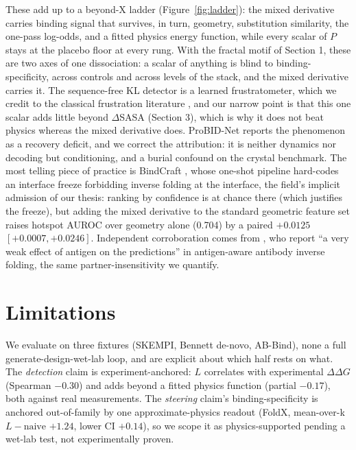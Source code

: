 \documentclass{article} %
\begin{document}
These add up to a beyond-X ladder (Figure~\ref{fig:ladder}): the mixed derivative carries binding signal that
survives, in turn, geometry, substitution similarity, the one-pass log-odds, and a fitted physics energy function,
while every scalar of $P$ stays at the placebo floor at every rung. With the fractal motif of Section 1, these are
two axes of one dissociation: a scalar of anything is blind to binding-specificity, across controls and across
levels of the stack, and the mixed derivative carries it. The sequence-free KL detector is a learned
frustratometer, which we credit to the classical frustration literature \citep{ferreiro2007frustration,
freiberger2019frustration}, and our narrow point is that this one scalar adds little beyond $\Delta$SASA (Section
3), which is why it does not beat physics whereas the mixed derivative does. ProBID-Net reports the phenomenon as a recovery deficit, and we
correct the attribution: it is neither dynamics nor decoding but conditioning, and a burial confound on the crystal
benchmark. The most telling piece of practice is BindCraft \citep{pacesa2024bindcraft}, whose one-shot pipeline
hard-codes an interface freeze forbidding inverse folding at the interface, the field's implicit admission of our
thesis: ranking by confidence is at chance there (which justifies the freeze), but adding the mixed derivative to
the standard geometric feature set raises hotspot AUROC over geometry alone (0.704) by a paired $+0.0125$
$[+0.0007, +0.0246]$. Independent corroboration comes from \citet{janusz2026antigen}, who report ``a very weak
effect of antigen on the predictions'' in antigen-aware antibody inverse folding, the same partner-insensitivity we
quantify.


\section{Limitations}

We evaluate on three fixtures (SKEMPI, Bennett de-novo, AB-Bind), none a full generate-design-wet-lab loop, and are
explicit about which half rests on what. The \emph{detection} claim is experiment-anchored: $L$ correlates with
experimental $\Delta\Delta G$ (Spearman $-0.30$) and adds beyond a fitted physics function (partial $-0.17$), both
against real measurements. The \emph{steering} claim's binding-specificity is anchored out-of-family by one
approximate-physics readout (FoldX, mean-over-k $L - \text{naive}$ $+1.24$, lower CI $+0.14$), so we scope it as
physics-supported pending a wet-lab test, not experimentally proven.
\end{document}
